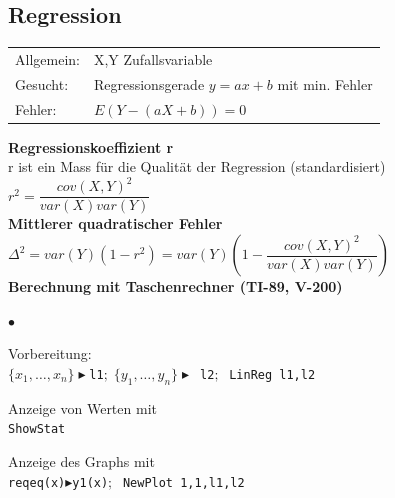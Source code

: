 \vspace{2mm}
	\begin{minipage}[]{9cm}
	\subsection{Regression  }
		\begin{tabular}{ll}
        Allgemein: & X,Y Zufallsvariable\\
        Gesucht: & Regressionsgerade $y=ax+b$ mit min. Fehler\\
        Fehler: & $E(Y-(aX+b))=0$
        \end{tabular}
		\vspace{.1cm}

		\textbf{Regressionskoeffizient r}\\
        r ist ein Mass für die Qualität der Regression (standardisiert)\\
        $r^2=\dfrac{cov(X,Y)^2}{var(X)var(Y)}$ \\
        
		\textbf{Mittlerer quadratischer Fehler}\\
        $ \Delta^2 = var(Y)(1-r^2) =
        var(Y)\left(1-\dfrac{cov(X,Y)^2}{var(X)var(Y)}\right) $ \\
        
        \textbf{Berechnung mit Taschenrechner (TI-89, V-200)}
        \begin{list}{$\bullet$}{\setlength{\itemsep}{0cm}
        \setlength{\parsep}{0cm} \setlength{\topsep}{0cm}}  
	        \item Vorbereitung:\\
	        \texttt{$\{x_1, \ldots, x_n\} \blacktriangleright$\texttt{l1}$; \; 
	        \{y_1, \ldots,y_n\}\blacktriangleright$ \texttt{l2}$; \;$} \texttt{LinReg l1,l2}
	        \item Anzeige von Werten mit \\ \texttt{ShowStat}
	        \item Anzeige des Graphs mit \\
	        \texttt{reqeq(x)}$\blacktriangleright$\texttt{y1(x)}$; \;$
	        \texttt{NewPlot 1,1,l1,l2}
        \end{list}
	\end{minipage}
